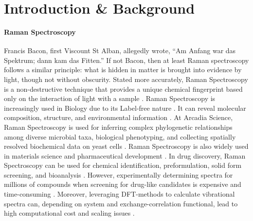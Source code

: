 \documentclass[10pt]{article}
\begin{document}
\section{Introduction \& Background}
\label{sec:introduction}

\paragraph{Raman Spectroscopy} Francis Bacon, first Viscount St Alban, allegedly wrote, ``Am Anfang war das Spektrum; dann kam das Fitten.'' If not Bacon, then at least Raman spectroscopy follows a similar principle: what is hidden in matter is brought into evidence by light, though not without obscurity. Stated more accurately, Raman Spectroscopy is a non-destructive technique that provides a unique chemical fingerprint based only on the interaction of light with a sample \citep{avasthi2024raman, braverman2025diy}. Raman Spectroscopy is increasingly used in Biology due to its Label-free nature \citep{han2012label}. It can reveal molecular composition, structure, and environmental information \citep{braverman2025diy}. At Arcadia Science, Raman Spectroscopy is used for inferring complex phylogenetic relationships among diverse microbial taxa, biological phenotyping, and collecting spatially resolved biochemical data on yeast cells \citep{avasthi2023raman, bulow2026coherent, essock2025comparison}. Raman Spectroscopy is also widely used in materials science and pharmaceutical development \citep{gala2015principles,neuville2014advances}. In drug discovery, Raman Spectroscopy can be used for chemical identification, preformulation, solid form screening, and bioanalysis \citep{paudel2015raman}. However, experimentally determining spectra for millions of compounds when screening for drug-like candidates is expensive and time-consuming \citep{cutshaw2023emerging, sorrentino2025mol2raman}. Moreover, leveraging DFT-methods to calculate vibrational spectra can, depending on system and exchange-correlation functional, lead to high computational cost and scaling issues \citep{taherivardanjani2022benchmarking, bremond2026contemporary}.
\end{document}
